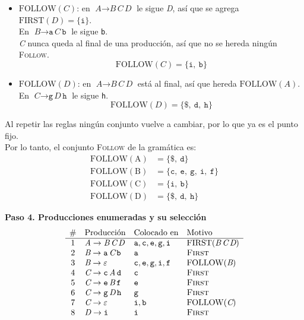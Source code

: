 \documentclass[12pt,letterpaper]{article}
\newcommand{\nt}[1]{\textit{#1}}
\newcommand{\tk}[1]{\texttt{#1}}
\newcommand{\tx}[1]{\text{#1}}
\newcommand{\First}[1]{\mathrm{FIRST}(#1)}
\newcommand{\Follow}[1]{\mathrm{FOLLOW}(#1)}
\newcommand{\eps}{\varepsilon}
\begin{document}
\begin{enumerate}[label=\arabic*.]
\begin{itemize}
\begin{itemize}
    \item $\Follow{\nt{C}}$: en $\nt{A}\to\nt{B}\,\nt{C}\,\nt{D}$ le sigue \nt{D}, así que se agrega $\First{\nt{D}}=\{\tk{i}\}$.\\
      En $\nt{B}\to\tk{a}\,\nt{C}\,\tk{b}$ le sigue \tk{b}.\\
      \nt{C} nunca queda al final de una producción, así que no se hereda ningún \textsc{Follow}.
      \[
      \Follow{\nt{C}} = \{\tk{i},\ \tk{b}\}
      \]
      
    \item $\Follow{\nt{D}}$: en $\nt{A}\to\nt{B}\,\nt{C}\,\nt{D}$ está al final, así que hereda
      $\Follow{\nt{A}}$.\\
      En $\nt{C}\to\tk{g}\,\nt{D}\,\tk{h}$ le sigue \tk{h}.
      \[
      \Follow{\nt{D}} = \{\tk{\$},\ \tk{d},\ \tk{h}\}
      \]
    \end{itemize}

    Al repetir las reglas ningún conjunto vuelve a cambiar, por lo que ya es el punto fijo.\\

    Por lo tanto, el conjunto \textsc{Follow} de la gramática es:
    \[
    \begin{aligned}
      \Follow{\tx{A}} &= \{\tk{\$},\ \tk{d}\} \\
      \Follow{\tx{B}} &= \{\tk{c},\ \tk{e},\ \tk{g},\ \tk{i},\ \tk{f}\} \\
      \Follow{\tx{C}} &= \{\tk{i},\ \tk{b}\} \\
      \Follow{\tx{D}} &= \{\tk{\$},\ \tk{d},\ \tk{h}\}
    \end{aligned}
    \]
    
    \textbf{Paso 4. Producciones enumeradas y su selección}
    \[
    \begin{array}{c l l l}
      \# & \text{Producción} & \text{Colocado en} & \text{Motivo} \\ \hline
      1 & \nt{A}\to\nt{B}\,\nt{C}\,\nt{D} & \tk{a},\tk{c},\tk{e},\tk{g},\tk{i} & \First{\nt{B}\,\nt{C}\,\nt{D}} \\
      2 & \nt{B}\to\tk{a}\,\nt{C}\,\tk{b} & \tk{a} & \text{\textsc{First}} \\
      3 & \nt{B}\to\eps & \tk{c},\tk{e},\tk{g},\tk{i},\tk{f} & \Follow{\nt{B}} \\
      4 & \nt{C}\to\tk{c}\,\nt{A}\,\tk{d} & \tk{c} & \text{\textsc{First}} \\
      5 & \nt{C}\to\tk{e}\,\nt{B}\,\tk{f} & \tk{e} & \text{\textsc{First}} \\
      6 & \nt{C}\to\tk{g}\,\nt{D}\,\tk{h} & \tk{g} & \text{\textsc{First}} \\
      7 & \nt{C}\to\eps & \tk{i},\tk{b} & \Follow{\nt{C}} \\
      8 & \nt{D}\to\tk{i} & \tk{i} & \text{\textsc{First}}
    \end{array}
    \]


\end{itemize}
\end{enumerate}
\end{document}
